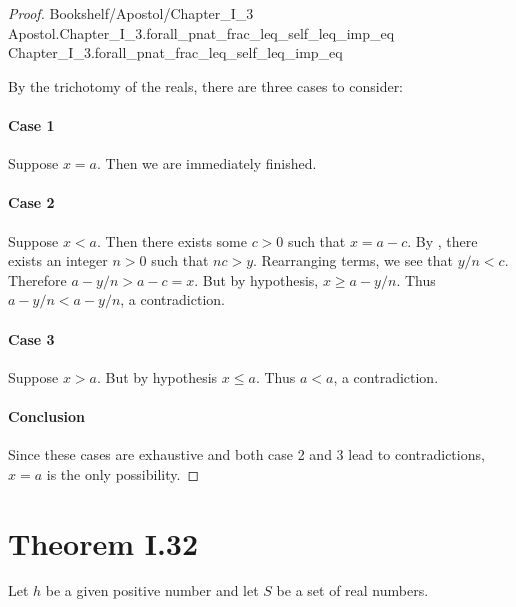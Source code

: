 \documentclass{article}
\newcommand{\link}[1]{\lean{../..}
  {Bookshelf/Apostol/Chapter\_I\_3}
  {Apostol.Chapter\_I\_3.#1}
  {Chapter\_I\_3.#1}
}
\begin{document}
\begin{proof}

  \link{forall\_pnat\_frac\_leq\_self\_leq\_imp\_eq}

  \divider

  By the trichotomy of the reals, there are three cases to consider:

  \paragraph{Case 1}%

    Suppose $x = a$.
    Then we are immediately finished.

  \paragraph{Case 2}%

    Suppose $x < a$.
    Then there exists some $c > 0$ such that $x = a - c$.
    By , there exists an integer $n > 0$ such that
      $nc > y$.
    Rearranging terms, we see that $y / n < c$.
    Therefore $a - y / n > a - c = x$.
    But by hypothesis, $x \geq a - y / n$.
    Thus $a - y / n < a - y / n$, a contradiction.

  \paragraph{Case 3}%

    Suppose $x > a$.
    But by hypothesis $x \leq a$.
    Thus $a < a$, a contradiction.

  \paragraph{Conclusion}%

    Since these cases are exhaustive and both case 2 and 3 lead to
      contradictions, $x = a$ is the only possibility.

\end{proof}

\section*{Theorem I.32}%
%

Let $h$ be a given positive number and let $S$ be a set of real numbers.

\subsection*{}%
%
\end{document}
